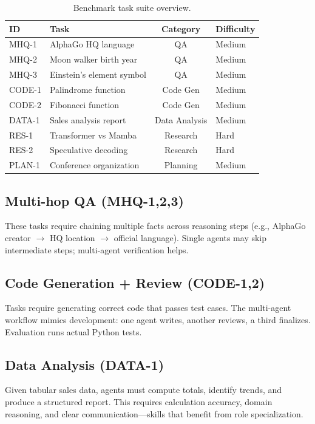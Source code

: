 \documentclass[sigconf,nonacm]{acmart}
\begin{document}
\begin{table}[t]
\centering
\caption{Benchmark task suite overview.}
\label{tab:tasks}
\small
\begin{tabular}{@{}llcl@{}}
\toprule
\textbf{ID} & \textbf{Task} & \textbf{Category} & \textbf{Difficulty} \\
\midrule
MHQ-1 & AlphaGo HQ language & QA & Medium \\
MHQ-2 & Moon walker birth year & QA & Medium \\
MHQ-3 & Einstein's element symbol & QA & Medium \\
CODE-1 & Palindrome function & Code Gen & Medium \\
CODE-2 & Fibonacci function & Code Gen & Medium \\
DATA-1 & Sales analysis report & Data Analysis & Medium \\
RES-1 & Transformer vs Mamba & Research & Hard \\
RES-2 & Speculative decoding & Research & Hard \\
PLAN-1 & Conference organization & Planning & Medium \\
\bottomrule
\end{tabular}
\end{table}

\subsection{Multi-hop QA (MHQ-1,2,3)}

These tasks require chaining multiple facts across reasoning steps (e.g., AlphaGo creator $\rightarrow$ HQ location $\rightarrow$ official language). Single agents may skip intermediate steps; multi-agent verification helps.

\subsection{Code Generation + Review (CODE-1,2)}

Tasks require generating correct code that passes test cases. The multi-agent workflow mimics development: one agent writes, another reviews, a third finalizes. Evaluation runs actual Python tests.

\subsection{Data Analysis (DATA-1)}

Given tabular sales data, agents must compute totals, identify trends, and produce a structured report. This requires calculation accuracy, domain reasoning, and clear communication—skills that benefit from role specialization.
\end{document}
